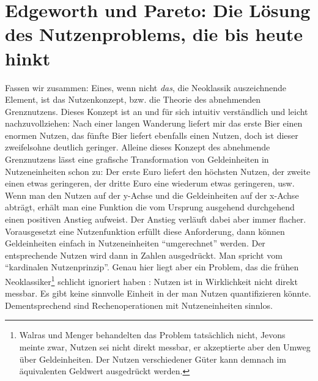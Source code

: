 \section{Edgeworth und Pareto: Die Lösung des Nutzenproblems, die bis heute hinkt}

Fassen wir zusammen: Eines, wenn nicht \textit{das}, die Neoklassik auszeichnende Element, ist das Nutzenkonzept, bzw. die Theorie des abnehmenden Grenznutzens. Dieses Konzept ist an und für sich intuitiv verständlich und leicht nachzuvollziehen: Nach einer langen Wanderung liefert mir das erste Bier einen enormen Nutzen, das fünfte Bier liefert ebenfalls einen Nutzen, doch ist dieser zweifelsohne deutlich geringer. Alleine dieses Konzept des abnehmende Grenznutzens lässt eine grafische Transformation von Geldeinheiten in Nutzeneinheiten schon zu: Der erste Euro liefert den höchsten Nutzen, der zweite einen etwas geringeren, der dritte Euro eine wiederum etwas geringeren, usw. Wenn man den Nutzen auf der y-Achse und die Geldeinheiten auf der x-Achse abträgt, erhält man eine Funktion die vom Ursprung ausgehend durchgehend einen positiven Anstieg aufweist. Der Anstieg verläuft dabei aber immer flacher. Vorausgesetzt eine Nutzenfunktion erfüllt diese Anforderung, dann können Geldeinheiten einfach in Nutzeneinheiten "`umgerechnet"' werden. Der entsprechende Nutzen wird dann in Zahlen ausgedrückt. Man spricht vom "`kardinalen Nutzenprinzip"'. Genau hier liegt aber ein Problem, das die frühen Neoklassiker\footnote{Walras und Menger behandelten das Problem tatsächlich nicht, Jevons meinte zwar, Nutzen sei nicht direkt messbar, er akzeptierte aber den Umweg über Geldeinheiten. Der Nutzen verschiedener Güter kann demnach im äquivalenten Geldwert ausgedrückt werden.} schlicht ignoriert haben \parencite[S. 328]{Blaug1962}: Nutzen ist in Wirklichkeit nicht direkt messbar. Es gibt keine sinnvolle Einheit in der man Nutzen quantifizieren könnte. Dementsprechend sind Rechenoperationen mit Nutzeneinheiten sinnlos.

